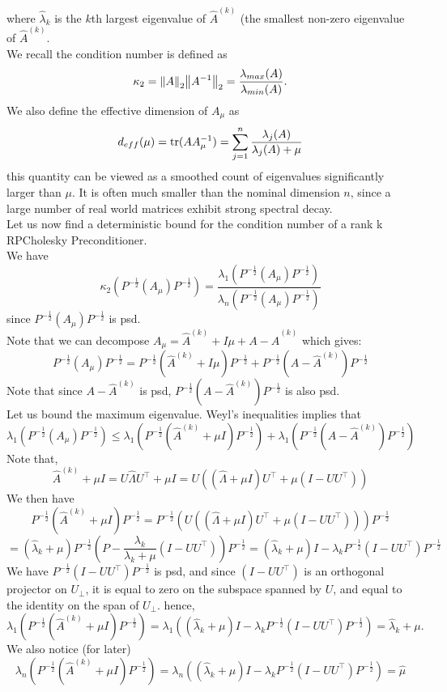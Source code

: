 \documentclass[12pt,letterpaper]{article}
\renewcommand{\le}{\leqslant}
\newcommand{\inv}[1]{#1^{-1}}
\newcommand{\snorm}[1]{\norm{#1}_2}
\newcommand{\precond}[1]{P^{-\frac{1}{2}}(#1) P^{-\frac{1}{2}}}
\newcommand{\RPCPrecond}{\precond{A_\mu}}
\newcommand{\RPC}{\hat A^{(k)}}
\begin{document}
\begin{enumerate}
    where $\hat \lambda_k$ is the $k$th largest eigenvalue of $\hat A^{(k)}$ (the smallest non-zero eigenvalue of $\hat A^{(k)}$.\\
    We recall the condition number is defined as 
    $$
    \kappa_2 = \snorm{A}\snorm{\inv A}
    = \frac{\lambda_{max}(A)}{\lambda_{min}(A)}.
    $$
    We also define the effective dimension of $A_\mu$ as 
    $$
    d_{eff}(\mu) = \trace(A\inv A_\mu) = \sum_{j=1}^n \frac{\lambda_j(A)}{\lambda_j(A)+\mu}
    $$
    this quantity can be viewed as a smoothed count of eigenvalues significantly larger than $\mu$. It is often much smaller than the nominal dimension $n$, since a large number of real world matrices exhibit strong spectral decay.\\
    Let us now find a deterministic bound for the condition number of a rank k RPCholesky Preconditioner.\\
    We have 
    $$
    \kappa_2(\RPCPrecond) = \frac{\lambda_1(\RPCPrecond)}{\lambda_n(\RPCPrecond)}
    $$
    since $\RPCPrecond$ is psd.\\
    Note that we can decompose $A_\mu = \RPC + I\mu + A - \RPC$ which gives:
    $$
    \RPCPrecond = \precond{\RPC + I\mu} + \precond{A- \RPC}
    $$
    Note that since $A-\RPC$ is psd, $\precond{A- \RPC}$ is also psd.\\
    Let us bound the maximum eigenvalue.
    Weyl's inequalities implies that 
    $$
    \lambda_1(\RPCPrecond) \le \lambda_1(\precond{\RPC + \mu I}) +
    \lambda_1(\precond{A - \RPC})
    $$
    Note that,
    $$
    \RPC + \mu I = U\hat \Lambda U^\top + \mu I
    = 
    U((\hat \Lambda + \mu I)U^\top + \mu(I-UU^\top))
    $$
    We then have
    $$
    \precond{\RPC + \mu I} = 
    \precond{U((\hat \Lambda + \mu I)U^\top + \mu(I-UU^\top))}
    $$$$
    = (\hat \lambda_k + \mu )
    \precond{P-\frac{\lambda_k}{\lambda_k+\mu}(I-UU^\top)}
    = 
    (\hat \lambda_k + \mu )
    I - \lambda_k\precond{I-UU^\top}
    $$
    We have $\precond{I-UU^\top}$ is psd, and since $(I-UU^\top)$ is an orthogonal projector on $U_\perp$, it is equal to zero on the subspace spanned by $U$, and equal to the identity on the span of $U_\perp$. 
    hence,
    $$
    \lambda_1(\precond{\RPC + \mu I}) 
    = \lambda_1((\hat \lambda_k + \mu )
    I - \lambda_k\precond{I-UU^\top})=
    \hat \lambda_k + \mu .
    $$
    We also notice (for later)
    $$
    \lambda_n(\precond{\RPC + \mu I}) 
    = \lambda_n((\hat \lambda_k + \mu )
    I - \lambda_k\precond{I-UU^\top})=
    \hat \mu 
    $$

\end{enumerate}
\end{document}
